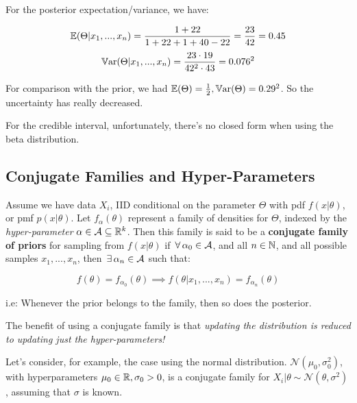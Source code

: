 \documentclass[a4paper]{article}
\begin{document}
                For the posterior expectation/variance, we have:

                \[
                    \mathbb{E}(\Theta | x_1, ..., x_n) = \frac{1 + 22}{1 + 22 + 1 + 40 -
                    22} = \frac{23}{42} = 0.45
                \]
                \[
                    \mathbb{V}\text{ar}(\Theta | x_1, ..., x_n) = \frac{23 \cdot 19}{42^2 \cdot
                    43} = 0.076^2
                \]

                For comparison with the prior, we had $\mathbb{E}(\Theta) = \frac{1}{2},
                \mathbb{V}\text{ar}(\Theta) = 0.29^2$. So the uncertainty has really decreased.

                For the credible interval, unfortunately, there's no closed form
                when using the beta distribution.

        \subsection{Conjugate Families and Hyper-Parameters}
            \begin{definition}
                Assume we have data $X_i$, IID conditional on the parameter
                $\Theta$ with pdf $f(x | \theta)$, or pmf $p(x | \theta)$. Let
                $f_\alpha(\theta)$ represent a family of densities for $\Theta$,
                indexed by the \textit{hyper-parameter} $\alpha \in \mathcal{A}
                \subseteq \mathbb{R}^k$. Then this family is said to be a
                \textbf{conjugate family of priors} for sampling from $f(x |
                \theta)$ if $\,\forall\, \alpha_0 \in \mathcal{A}$, and all $n \in \mathbb{N}$,
                and all possible samples $x_1, ..., x_n$, then $\,\exists\, \alpha_n \in
                \mathcal{A}$ such that:

                \[
                    f(\theta) = f_{\alpha_0}(\theta) \implies f(\theta | x_1,
                    ..., x_n) = f_{\alpha_n}(\theta)
                \]

                i.e: Whenever the prior belongs to the family, then so does the
                posterior.
            \end{definition}

            The benefit of using a conjugate family is that \textit{updating the
            distribution is reduced to updating just the hyper-parameters!}

            Let's consider, for example, the case using the normal distribution.
            $\mathcal{N}(\mu_0, \sigma_0^2)$, with hyperparameters $\mu_0
            \in \mathbb{R}, \sigma_0 > 0$, is a conjugate family for $X_i | \theta \sim
            \mathcal{N}(\theta, \sigma^2)$, assuming that $\sigma$ is known.
\end{document}
